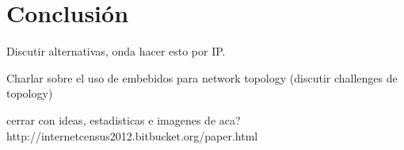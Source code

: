 \section{Conclusión}

Discutir alternativas, onda hacer esto por IP.

Charlar sobre el uso de embebidos para network topology (discutir challenges de topology)

cerrar con ideas, estadisticas e imagenes de aca?
http://internetcensus2012.bitbucket.org/paper.html